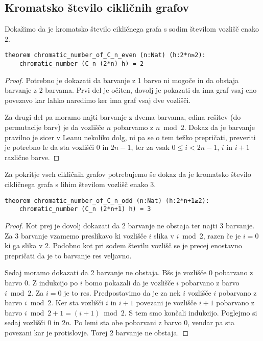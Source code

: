 \documentclass[mat1]{fmfdelo}
\begin{document}
\subsection{Kromatsko število cikličnih grafov}
Dokažimo da je kromatsko število cikličnega grafa s sodim številom vozlišč enako $2$.
\begin{lstlisting}
theorem chromatic_number_of_C_n_even (n:Nat) (h:2*n≥2):
    chromatic_number (C_n (2*n) h) = 2
\end{lstlisting}
\begin{proof}
Potrebno je dokazati da barvanje z 1 barvo ni mogoče in da obstaja barvanje z 2 barvama.
Prvi del je očiten, dovolj je pokazati da ima graf vsaj eno povezavo kar lahko naredimo ker ima graf vsaj dve vozlišči.

Za drugi del pa moramo najti barvanje z dvema barvama, edina rešitev (do permutacije barv) je da vozlišče
$n$ pobarvamo z $n\bmod 2$. Dokaz da je barvanje pravilno je sicer v Leanu nekoliko dolg, ni pa se o tem
težko prepričati, preveriti je potrebno le da sta vozlišči $0$ in $2n-1$, ter za vsak $0\le i<2n-1$, $i$ in $i+1$ različne barve.
\end{proof}

Za pokritje vseh cikličnih grafov potrebujemo še dokaz da je kromatsko število cikličnega grafa s lihim številom vozlišč enako $3$.
\begin{lstlisting}
theorem chromatic_number_of_C_n_odd (n:Nat) (h:2*n+1≥2):
    chromatic_number (C_n (2*n+1) h) = 3
\end{lstlisting}
\begin{proof}
Kot prej je dovolj dokazati da 2 barvanje ne obstaja ter najti 3 barvanje. 
Za 3 barvanje vzamemo preslikavo ki vozlišče $i$ slika v $i\bmod 2$, razen če je $i=0$ ki ga slika v $2$.
Podobno kot pri sodem številu vozlišč se je precej enostavno prepričati da je to barvanje res veljavno. 

Sedaj moramo dokazati da 2 barvanje ne obstaja. Bšs je vozlišče $0$ pobarvano z barvo $0$.
Z indukcijo po $i$ bomo pokazali da je vozlišče $i$ pobarvano z barvo $i\bmod 2$.
Za $i=0$ je to res. Predpostavimo da je za nek $i$ vozlišče $i$ pobarvano z barvo $i\bmod 2$.
Ker sta vozlišči $i$ in $i+1$ povezani je vozlišče $i+1$ pobarvano z barvo $i\bmod 2 + 1 = (i+1)\bmod 2$.
S tem smo končali indukcijo.
Poglejmo si sedaj vozlišči $0$ in $2n$. Po lemi sta obe pobarvani z barvo $0$, vendar pa sta povezani kar je protislovje.
Torej 2 barvanje ne obstaja. 
\end{proof}
\end{document}

